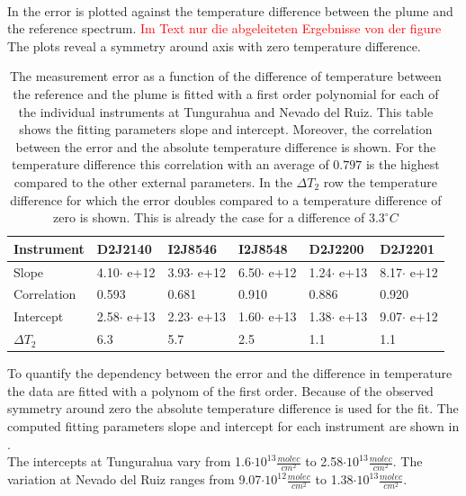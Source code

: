 \\
In  the  error is plotted against the temperature difference between the plume and the reference spectrum. \textcolor{red}{ Im Text nur die abgeleiteten Ergebnisse von der figure} The plots reveal a symmetry around axis with zero temperature difference.
\begin{table}[h]
	\centering
	\begin{tabular}{|p{2cm}|p{2cm}|p{2cm}|p{2cm}|p{2cm}|p{2cm}|}
		Instrument	&D2J2140&I2J8546& I2J8548&D2J2200&D2J2201\\
		\toprule
		Slope&4.10$\cdot$ e+12 &3.93$\cdot$ e+12 &6.50$\cdot$ e+12 &1.24$\cdot$ e+13&8.17$\cdot$ e+12 \\
		\midrule
		Correlation
		& 
		0.593& 
		0.681& 
		0.910& 
		0.886& 
		0.920\\
		\midrule
		Intercept&2.58$\cdot$ e+13&2.23$\cdot$ e+13&1.60$\cdot$ e+13& 1.38$\cdot$ e+13& 9.07$\cdot$ e+12\\
		\midrule
		$\Delta T_{2}$&6.3&5.7&2.5&1.1&1.1\\
		\bottomrule
	\end{tabular}
	\label{tab:tempe}
	\caption{The  measurement error as a function of the difference of temperature between the reference and the plume is fitted with a first order polynomial for each of the individual instruments at Tungurahua and Nevado del Ruiz. This table shows the fitting parameters slope and intercept. Moreover, the correlation between the  error and the absolute temperature difference is shown. For the temperature difference this correlation with an average of $0.797$ is the highest compared to the other external parameters. In the $\Delta T_{2}$ row the temperature difference for which the error doubles compared to a temperature difference of zero is shown. This is already the case for a difference of $3.3^\circ C$}
\end{table}
To quantify the dependency between the  error and the difference in temperature the data are fitted with a polynom of the first order. Because of the observed symmetry around zero the absolute temperature difference is used for the fit. The computed fitting parameters slope and intercept for each instrument are shown in . \\
The intercepts at Tungurahua vary from 1.6$\cdot10^{13}\frac{molec}{cm^2}$ to 2.58$\cdot10^{13}\frac{molec}{cm^2}$. The variation at Nevado del Ruiz ranges from  9.07$\cdot10^{12}\frac{molec}{cm^2}$ to 1.38$\cdot10^{13}\frac{molec}{cm^2}$.\\
